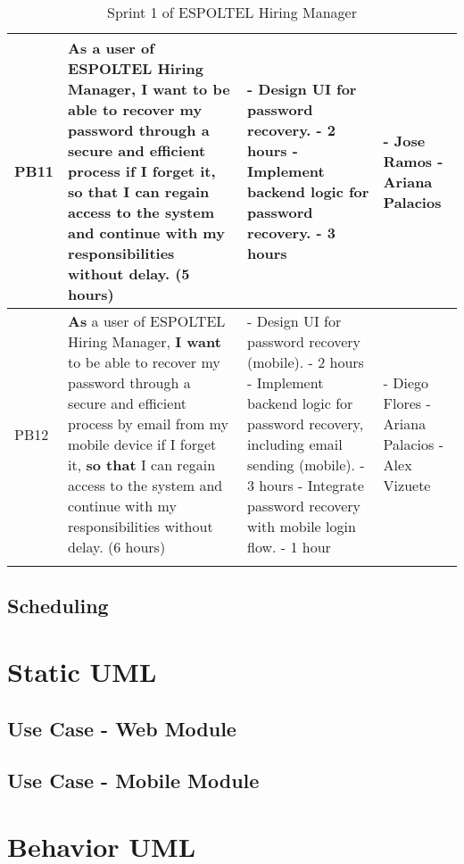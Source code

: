 \documentclass{scrreprt}
\begin{document}
\begin{longtable}{|p{1.5cm}|p{5.5cm}|p{4.5cm}|p{3cm}|}
PB11 & \textbf{As} a user of ESPOLTEL Hiring Manager, \textbf{I want} to be able to recover my password through a secure and efficient process if I forget it, \textbf{so that} I can regain access to the system and continue with my responsibilities without delay. (5 hours) & 
- Design UI for password recovery. - 2 hours \newline
- Implement backend logic for password recovery. - 3 hours
&
- Jose Ramos \newline
- Ariana Palacios
\\ \hline
PB12 & \textbf{As} a user of ESPOLTEL Hiring Manager, \textbf{I want} to be able to recover my password through a secure and efficient process by email from my mobile device if I forget it, \textbf{so that} I can regain access to the system and continue with my responsibilities without delay. (6 hours) &
- Design UI for password recovery (mobile). - 2 hours \newline
- Implement backend logic for password recovery, including email sending (mobile). - 3 hours\newline
- Integrate password recovery with mobile login flow. - 1 hour
&
- Diego Flores \newline
- Ariana Palacios \newline
- Alex Vizuete
\\ \hline

\caption{Sprint 1 of ESPOLTEL Hiring Manager}
\end{longtable}
\section{Scheduling}


\chapter{Static UML}
\section{Use Case - Web Module}
\section{Use Case - Mobile Module}



\chapter{Behavior UML}
\end{document}
